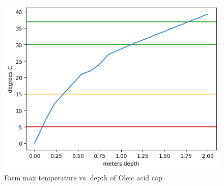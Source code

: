 \documentclass[fleqn,10pt]{Stylesheet} %
\begin{document}
\begin{figure}
    \centering
    \includegraphics[width=\linewidth]{figures/fig_bp.png}
    \caption{Farm max temperature vs. depth of Oleic acid cap}
    \label{fig:farm}
\end{figure}




\clearpage

\end{document}
